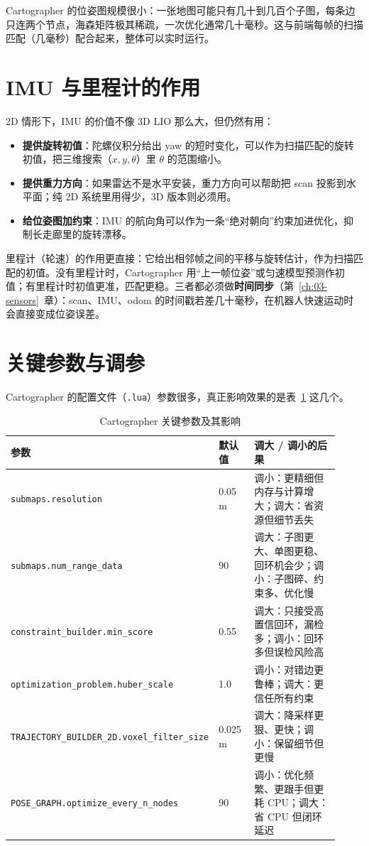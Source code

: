 Cartographer 的位姿图规模很小：一张地图可能只有几十到几百个子图，每条边只连两个节点，海森矩阵极其稀疏，一次优化通常几十毫秒。这与前端每帧的扫描匹配（几毫秒）配合起来，整体可以实时运行。

\section{IMU 与里程计的作用}\label{sec:15-imu}

2D 情形下，IMU 的价值不像 3D LIO 那么大，但仍然有用：
\begin{itemize}
  \item \textbf{提供旋转初值}：陀螺仪积分给出 yaw 的短时变化，可以作为扫描匹配的旋转初值，把三维搜索（$x,y,\theta$）里 $\theta$ 的范围缩小。
  \item \textbf{提供重力方向}：如果雷达不是水平安装，重力方向可以帮助把 scan 投影到水平面；纯 2D 系统里用得少，3D 版本则必须用。
  \item \textbf{给位姿图加约束}：IMU 的航向角可以作为一条``绝对朝向''约束加进优化，抑制长走廊里的旋转漂移。
\end{itemize}
里程计（轮速）的作用更直接：它给出相邻帧之间的平移与旋转估计，作为扫描匹配的初值。没有里程计时，Cartographer 用``上一帧位姿''或匀速模型预测作初值；有里程计时初值更准，匹配更稳。三者都必须做\textbf{时间同步}（第~\ref{ch:03-sensors}~章）：scan、IMU、odom 的时间戳若差几十毫秒，在机器人快速运动时会直接变成位姿误差。

\section{关键参数与调参}\label{sec:15-tuning}

Cartographer 的配置文件（\lstinline{.lua}）参数很多，真正影响效果的是表~\ref{tab:15-params} 这几个。

\begin{table}[htbp]
  \centering
  \caption{Cartographer 关键参数及其影响}\label{tab:15-params}
  \footnotesize
  \begin{tabular}{p{0.36\linewidth}p{0.12\linewidth}p{0.44\linewidth}}
    \toprule
    参数 & 默认值 & 调大 / 调小的后果 \\
    \midrule
    \lstinline{submaps.resolution} & 0.05 m & 调小：更精细但内存与计算增大；调大：省资源但细节丢失 \\
    \lstinline{submaps.num_range_data} & 90 & 调大：子图更大、单图更稳、回环机会少；调小：子图碎、约束多、优化慢 \\
    \lstinline{constraint_builder.min_score} & 0.55 & 调大：只接受高置信回环，漏检多；调小：回环多但误检风险高 \\
    \lstinline{optimization_problem.huber_scale} & 1.0 & 调小：对错边更鲁棒；调大：更信任所有约束 \\
    \lstinline{TRAJECTORY_BUILDER_2D.voxel_filter_size} & 0.025 m & 调大：降采样更狠、更快；调小：保留细节但更慢 \\
    \lstinline{POSE_GRAPH.optimize_every_n_nodes} & 90 & 调小：优化频繁、更跟手但更耗 CPU；调大：省 CPU 但闭环延迟 \\
    \bottomrule
  \end{tabular}
\end{table}

